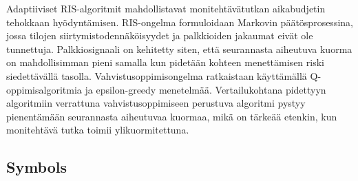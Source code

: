 \documentclass[english, 12pt, a4paper, elec, utf8, a-1b, online]{aaltothesis}
\numberwithin{equation}{section}
\begin{document}
\begin{abstractpage}[finnish]
Adaptiiviset RIS-algoritmit mahdollistavat monitehtävätutkan aikabudjetin tehokkaan hyödyntämisen. 
RIS-ongelma formuloidaan Markovin päätösprosessina, jossa tilojen siirtymistodennäköisyydet ja palkkioiden jakaumat eivät ole tunnettuja. 
Palkkiosignaali on kehitetty siten, että seurannasta aiheutuva kuorma on mahdollisimman pieni samalla kun pidetään kohteen menettämisen riski siedettävällä tasolla. 
Vahvistusoppimisongelma ratkaistaan käyttämällä Q-oppimisalgoritmia ja epsilon-greedy menetelmää. 
Vertailukohtana pidettyyn algoritmiin verrattuna vahvistusoppimiseen perustuva algoritmi pystyy pienentämään seurannasta aiheutuvaa kuormaa, mikä on tärkeää etenkin, kun monitehtävä tutka toimii ylikuormitettuna.
\end{abstractpage}

\newpage






\thesistableofcontents



\subsection*{Symbols}
\end{document}
